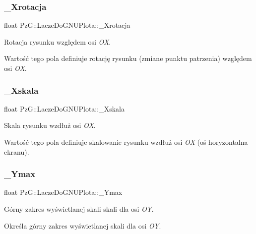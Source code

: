 \subsubsection{\texorpdfstring{\_Xrotacja}{\_Xrotacja}}
{\footnotesize\ttfamily float Pz\+G\+::\+Lacze\+Do\+G\+N\+U\+Plota\+::\+\_\+\+Xrotacja\hspace{0.3cm}{\ttfamily [protected]}}



Rotacja rysunku względem osi {\itshape OX}. 

Wartość tego pola definiuje rotację rysunku (zmiane punktu patrzenia) względem osi {\itshape OX}. \mbox{\label{class_pz_g_1_1_lacze_do_g_n_u_plota_a2c9303c4dbb4c9f0ddc4f1fe02eb3f70}} 
\subsubsection{\texorpdfstring{\_Xskala}{\_Xskala}}
{\footnotesize\ttfamily float Pz\+G\+::\+Lacze\+Do\+G\+N\+U\+Plota\+::\+\_\+\+Xskala\hspace{0.3cm}{\ttfamily [protected]}}



Skala rysunku wzdłuż osi {\itshape OX}. 

Wartość tego pola definiuje skalowanie rysunku wzdłuż osi {\itshape OX} (oś horyzontalna ekranu). \mbox{\label{class_pz_g_1_1_lacze_do_g_n_u_plota_ad7dfd3fad82ea0720ec89eacc18410bf}} 
\subsubsection{\texorpdfstring{\_Ymax}{\_Ymax}}
{\footnotesize\ttfamily float Pz\+G\+::\+Lacze\+Do\+G\+N\+U\+Plota\+::\+\_\+\+Ymax\hspace{0.3cm}{\ttfamily [protected]}}



Górny zakres wyświetlanej skali skali dla osi {\itshape OY}. 

Określa górny zakres wyświetlanej skali dla osi {\itshape OY}. \mbox{\label{class_pz_g_1_1_lacze_do_g_n_u_plota_abc555fd6b82b0d5c9efb4802b58dc317}} 
